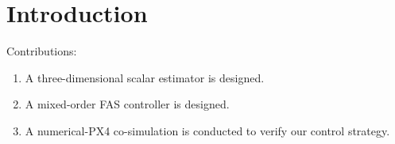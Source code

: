 \documentclass[5p,authoryear,preprint]{elsarticle}\linenofalse
\begin{document}
\def\alI{a_l^1}
\def\alO{a_l^0}
\def\arhoI{a_\rho^1}
\def\arhoO{a_\rho^0}
\def\aomega{a_{\omega}}
\def\avII{a_{v_2}}
\def\B{\bm B}
\def\intd{\,\mathrm{d}}
\def\ddt{\frac{\mathrm d}{\mathrm dt}}
\def\erho{e_\rho}
\def\erhodot{\dot{e}_\rho}
\def\erhoddot{\ddot{e}_\rho}
\def\erhohat{\hat{e}_\rho}
\def\evII{e_{v_2}}
\def\evIIdot{\dot{e}_{v_2}}
\def\fai{\bm{\varphi}}
\def\faidot{\dot{\bm{\varphi}}}
\def\faiT{\bm{\varphi}^\mathrm{T}}
\def\faibar{\bar{\bm{\varphi}}}
\def\faibarT{\bar{\bm{\varphi}}^\mathrm{T}}
\def\faibardot{\dot{\bar{\fai}}}
\def\ldian{\dot{l}}
\def\lddot{\ddot{l}}
\def\n{\bm{n}}
\def\nT{\bm{n}^\mathrm{T}}
\def\omegaII{\omega_2}
\def\omegaIII{\omega_3}
\def\omegaIIIdot{\dot{\omega}_3}
\def\rhodot{\dot{\rho}}
\def\rhoddot{\ddot{\rho}}
\def\rhohat{\hat{\rho}}
\def\rhohatdot{\dot{\hat{\rho}}}
\def\rhotilde{\tilde{\rho}}
\def\rhotildedot{\dot{\tilde{\rho}}}
\def\R{\mathbb{R}}
\def\RIII{\mathbb{R}^3}
\def\SII{\mathbb{S}^2}
\def\T{\mathrm{T}}
\def\tauI{\bm{\tau}_1}
\def\tauIdot{\dot{\bm{\tau}}_1}
\def\tauIdotT{\dot{\bm{\tau}}_1^\mathrm{T}}
\def\tauIT{\bm{\tau}_1^\mathrm{T}}
\def\tauII{\bm{\tau}_2}
\def\tauIIdot{\dot{\bm{\tau}}_2}
\def\tauIIdotT{\dot{\bm{\tau}}_2^\mathrm{T}}
\def\tauIIT{\bm{\tau}_2^\mathrm{T}}
\def\tauIII{\bm{\tau}_3}
\def\tauIIIdot{\dot{\bm{\tau}}_3}
\def\tauIIIdotT{\dot{\bm{\tau}}_3^\mathrm{T}}
\def\tauIIIT{\bm{\tau}_3^\mathrm{T}}
\def\tauIIiii{\bm{\tau}_{23}}
\def\tauIIiiiT{\bm{\tau}_{23}^\mathrm{T}}
\def\thetadot{\dot{\theta}}
\def\thetaddot{\ddot{\theta}}
\def\vbar{\bar{v}}
\def\Vdot{\dot{V}}
\def\vI{v_1}
\def\vIdot{\dot{v}_1}
\def\vII{v_2}
\def\vIIdot{\dot{v}_2}
\def\vIII{v_3}
\def\vIIIdot{\dot{v}_3}
\def\x{\bm{x}}
\def\xdot{\dot{\bm{x}}}
\def\xhat{\hat{\bm{x}}}
\def\xhatdot{\dot{\hat{\bm{x}}}}
\def\xtilde{\tilde{\bm{x}}}
\def\xtildedot{\dot{\tilde{\bm{x}}}}
\def\xtildeT{\tilde{\bm{x}}^\mathrm{T}}
\def\y{\bm{y}}
\def\ydot{\dot{\bm{y}}}
\def\yddot{\ddot{\bm{y}}}
\def\vbar{\bar{v}}
\def\vbardot{\dot{\bar{v}}}

\section{Introduction}

Contributions:
\begin{enumerate}
\item A three-dimensional scalar estimator is designed.

\item A mixed-order FAS controller is designed.

\item A numerical-PX4 co-simulation is conducted to verify our control strategy.

\end{enumerate}
\end{document}
